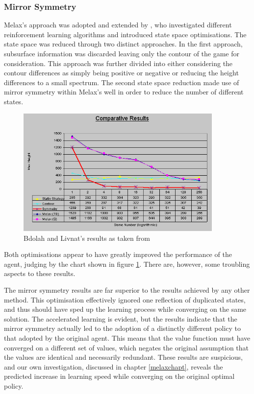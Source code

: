 \documentclass{rucsthesis}
\begin{document}
\subsubsection{Mirror Symmetry}

Melax's approach was adopted and extended by \cite{yaeltetris}, who investigated different reinforcement learning algorithms and introduced state space optimisations. The state space was reduced through two distinct approaches. In the first approach, subsurface information was discarded leaving only the contour of the game for consideration. This approach was further divided into either considering the contour differences as simply being positive or negative or reducing the height differences to a small spectrum. The second state space reduction made use of mirror symmetry within Melax's well in order to reduce the number of different states.

\begin{figure}[h]
\centering
\includegraphics[width=4in]{results.png}
\caption{Bdolah and Livnat's results as taken from \cite{yaeltetris}}
\label{fig:yaelres}
\end{figure}

Both optimisations appear to have greatly improved the performance of the agent, judging by the chart shown in figure \ref{fig:yaelres}. There are, however, some troubling aspects to these results.

The mirror symmetry results are far superior to the results achieved by any other method. This optimisation effectively ignored one reflection of duplicated states, and thus should have sped up the learning process while converging on the same solution. The accelerated learning is evident, but the results indicate that the mirror symmetry actually led to the adoption of a distinctly different policy to that adopted by the original agent. This means that the value function must have converged on a different set of values, which negates the original assumption that the values are identical and necessarily redundant. These results are suspicious, and our own investigation, discussed in chapter \ref{melaxchapt}, reveals the predicted increase in learning speed while converging on the original optimal policy.
\end{document}
